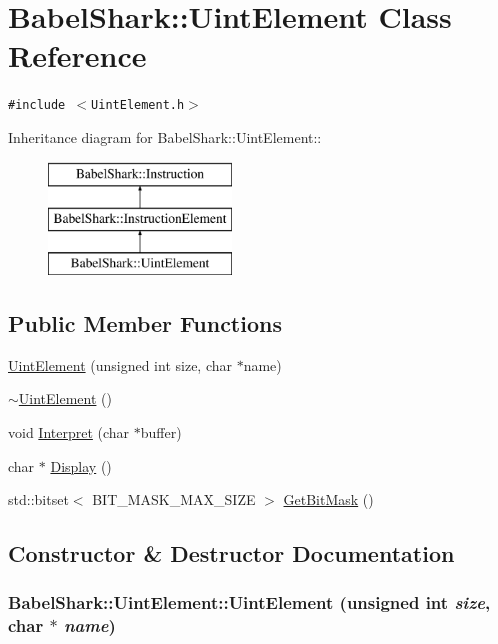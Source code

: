 \hypertarget{class_babel_shark_1_1_uint_element}{
\section{BabelShark::UintElement Class Reference}
\label{class_babel_shark_1_1_uint_element}
}
{\tt \#include $<$UintElement.h$>$}

Inheritance diagram for BabelShark::UintElement::\begin{figure}[H]
\begin{center}
\leavevmode
\includegraphics[height=3cm]{class_babel_shark_1_1_uint_element}
\end{center}
\end{figure}
\subsection*{Public Member Functions}
\begin{CompactItemize}
\item 
\hyperlink{class_babel_shark_1_1_uint_element_3c15e5ce737b883dd374b35f62a7e81e}{UintElement} (unsigned int size, char $\ast$name)
\item 
\hyperlink{class_babel_shark_1_1_uint_element_c298866a90094639668c65602190c6fa}{$\sim$UintElement} ()
\item 
void \hyperlink{class_babel_shark_1_1_uint_element_61c83ce006915d71961667032f77b6db}{Interpret} (char $\ast$buffer)
\item 
char $\ast$ \hyperlink{class_babel_shark_1_1_uint_element_06162488c1a349e17d165d038e5cd646}{Display} ()
\item 
std::bitset$<$ BIT\_\-MASK\_\-MAX\_\-SIZE $>$ \hyperlink{class_babel_shark_1_1_uint_element_f81423a50db5341b3dd745089203269f}{GetBitMask} ()
\end{CompactItemize}


\subsection{Constructor \& Destructor Documentation}
\hypertarget{class_babel_shark_1_1_uint_element_3c15e5ce737b883dd374b35f62a7e81e}{
\subsubsection[{UintElement}]{\setlength{\rightskip}{0pt plus 5cm}BabelShark::UintElement::UintElement (unsigned int {\em size}, \/  char $\ast$ {\em name})}}
\label{class_babel_shark_1_1_uint_element_3c15e5ce737b883dd374b35f62a7e81e}


